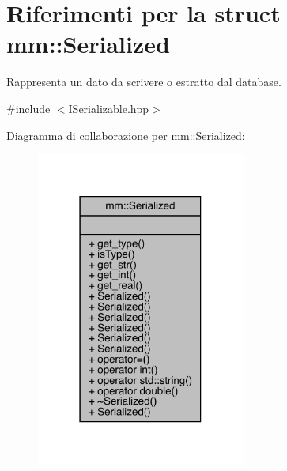 \hypertarget{structmm_1_1_serialized}{}\section{Riferimenti per la struct mm\+:\+:Serialized}
\label{structmm_1_1_serialized}


Rappresenta un dato da scrivere o estratto dal database.  




{\ttfamily \#include $<$I\+Serializable.\+hpp$>$}



Diagramma di collaborazione per mm\+:\+:Serialized\+:\nopagebreak
\begin{figure}[H]
\begin{center}
\leavevmode
\includegraphics[width=195pt]{d2/de9/structmm_1_1_serialized__coll__graph}
\end{center}
\end{figure}
